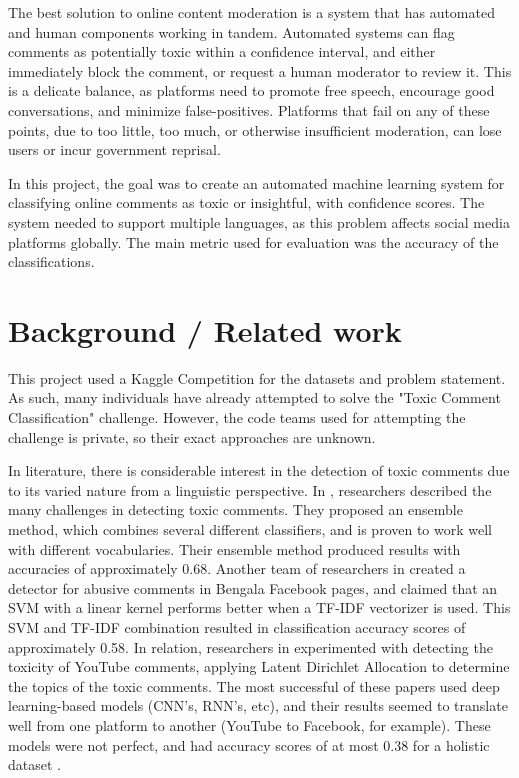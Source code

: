 \documentclass{article}
\begin{document}
The best solution to online content moderation is a system that has automated and human components working in tandem. Automated systems can flag comments as potentially toxic within a confidence interval, and either immediately block the comment, or request a human moderator to review it. This is a delicate balance, as platforms need to promote free speech, encourage good conversations, and minimize false-positives. Platforms that fail on any of these points, due to too little, too much, or otherwise insufficient moderation, can lose users or incur government reprisal.

In this project, the goal was to create an automated machine learning system for classifying online comments as toxic or insightful, with confidence scores. The system needed to support multiple languages, as this problem affects social media platforms globally. The main metric used for evaluation was the accuracy of the classifications.

\section{Background / Related work}

This project used a Kaggle Competition \cite{kaggle_competition} for the datasets and problem statement. As such, many individuals have already attempted to solve the "Toxic Comment Classification" challenge. However, the code teams used for attempting the challenge is private, so their exact approaches are unknown.

In literature, there is considerable interest in the detection of toxic comments \cite{almerekhi2019detecting} due to its varied nature from a linguistic perspective. In \cite{vanaken2018challenges}, researchers described the many challenges in detecting toxic comments. They proposed an ensemble method, which combines several different classifiers, and is proven to work well with different vocabularies. Their ensemble method produced results with accuracies of approximately 0.68. Another team of researchers in \cite{8660863} created a detector for abusive comments in Bengala Facebook pages, and claimed that an SVM with a linear kernel performs better when a TF-IDF vectorizer is used. This SVM and TF-IDF combination resulted in classification accuracy scores of approximately 0.58. In relation, researchers in \cite{obadimu2019identifying} experimented with detecting the toxicity of YouTube comments, applying Latent Dirichlet Allocation to determine the topics of the toxic comments. The most successful of these papers used deep learning-based models \cite{deep_learning_approaches} (CNN's, RNN's, etc), and their results seemed to translate well from one platform to another (YouTube to Facebook, for example). These models were not perfect, and had accuracy scores of at most 0.38 for a holistic dataset \cite{deep_learning_approaches}.
\end{document}
